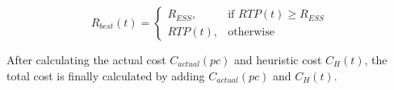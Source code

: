 \begin{equation}
\label{eq:R_best}
R_{best}(t) = 
\begin{cases}
    R_{ESS},& \text{if } RTP(t)\geq R_{ESS}\\
    RTP(t),              & \text{otherwise}
\end{cases}
\end{equation}

After calculating the actual cost  $C_{actual}(pc)$ and heuristic cost $C_H(t)$, the total cost is finally calculated by adding  $C_{actual}(pc)$ and $C_H(t)$.

